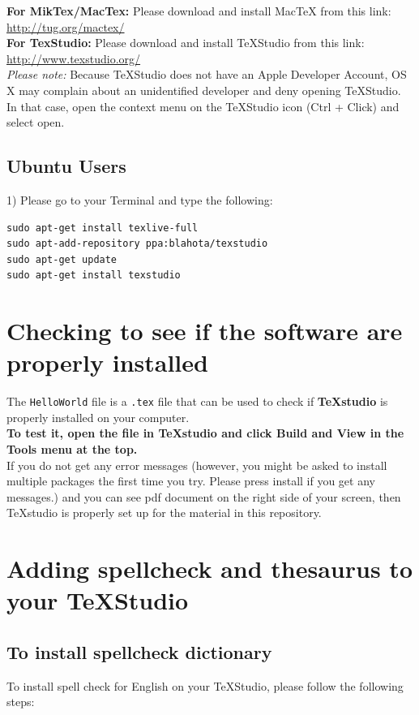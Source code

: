 \documentclass[]{article}
\begin{document}
\textbf{For MikTex/MacTex:}
Please download and install MacTeX from this link: \url{http://tug.org/mactex/} \\

\textbf{For TexStudio:}
Please download and install TeXStudio from this link: \url{http://www.texstudio.org/} \\

\textit{Please note:} Because TeXStudio does not have an Apple Developer Account, OS X may complain about an unidentified developer and deny opening TeXStudio. In that case, open the context menu on the TeXStudio icon (Ctrl + Click) and select open.

\subsection*{Ubuntu Users}

1) Please go to your Terminal and type the following:
\begin{verbatim}
sudo apt-get install texlive-full
sudo apt-add-repository ppa:blahota/texstudio
sudo apt-get update
sudo apt-get install texstudio
\end{verbatim}


\section*{Checking to see if the software are properly installed}

The \texttt{HelloWorld} file is a \texttt{.tex} file that can be used to check if \textbf{TeXstudio} is properly installed on your computer. \\

\textbf{To test it, open the file in TeXstudio and click Build and View in the Tools menu at the top. } \\

If you do not get any error messages (however, you might be asked to install multiple packages the first time you try. Please press install if you get any messages.) and you can see pdf document on the right side of your screen,  then TeXstudio is properly set up for the material in this repository.

\section*{Adding spellcheck and thesaurus to your TeXStudio}

\subsection*{To install spellcheck dictionary}
To install spell check for English on your TeXStudio, please follow the following steps:
\end{document}
